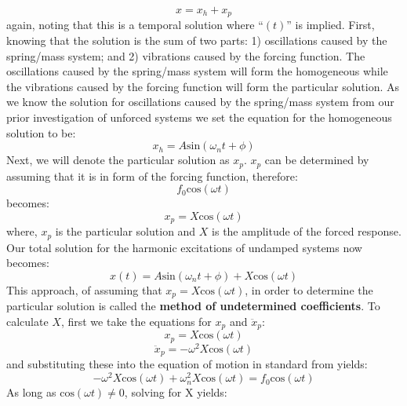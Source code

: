 \documentclass[12pt,letter]{article}
\numberwithin{ex}{section} %
\numberwithin{re}{section} %
\numberwithin{vcs}{section} %
\begin{document}
			\begin{equation}
				x = x_h + x_p
			\end{equation}	
			again, noting that this is a temporal solution where ``$(t)$'' is implied. First, knowing that the solution is the sum of two parts: 1) oscillations caused by the spring/mass system; and 2) vibrations caused by the forcing function. The oscillations caused by the spring/mass system will form the homogeneous while the vibrations caused by the forcing function will form the particular solution. As we know the solution for oscillations caused by the spring/mass system from our prior investigation of unforced systems we set the equation for the homogeneous solution to be:
			\begin{equation}
				x_h = A\text{sin}(\omega_n t + \phi)
			\end{equation}			
			Next, we will denote the particular solution as $x_p$. $x_p$ can be determined by assuming that it is in form of the forcing function, therefore:
			\begin{equation}
				f_0\text{cos}(\omega t)
			\end{equation}	
			becomes:
			\begin{equation}
				x_p  =X\text{cos}(\omega t)
			\end{equation}						
			where, $x_p$ is the particular solution and $X$ is the amplitude of the forced response. Our total solution for the harmonic excitations of undamped systems now becomes:
			\begin{equation}
				x(t) = A\text{sin}(\omega_n t + \phi) + X\text{cos}(\omega t) 
			\end{equation}				
			This approach, of assuming that $x_p=X\text{cos}(\omega t)$, in order to determine the particular solution is called the \textbf{method of undetermined coefficients}. To calculate $X$, first we take the equations for $x_p$ and $\ddot{x}_p $:
			\begin{equation}
				x_p = X\text{cos}(\omega t)
			\end{equation}	
			\begin{equation}
				\ddot{x}_p = -\omega^2X\text{cos}(\omega t)
			\end{equation}				
			and substituting these into the equation of motion in standard from yields:
			\begin{equation}
				-\omega^2X\text{cos}(\omega t)+\omega_n^2X\text{cos}(\omega t) = f_0\text{cos}(\omega t)
			\end{equation}		
			As long as 	$\text{cos}(\omega t) \neq  0$, solving for X yields:
\end{document}
